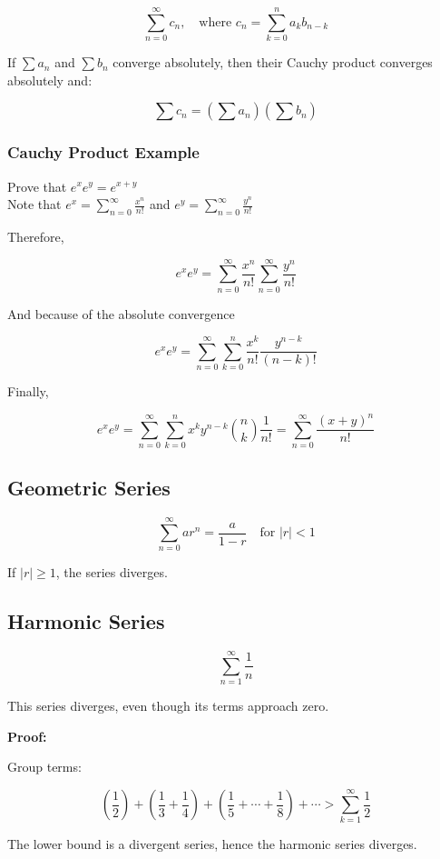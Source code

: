 \[
    \sum_{n=0}^\infty c_n, \quad \text{where } c_n = \sum_{k=0}^n a_k b_{n-k}
\]

If \(\sum a_n\) and \(\sum b_n\) converge absolutely, then their Cauchy product converges absolutely and:

\[
    \sum c_n = \left( \sum a_n \right) \left( \sum b_n \right)
\]

\subsubsection{Cauchy Product Example}

Prove that \(e^x  e^y = e^{x + y}\)\\
Note that \(e^x = \sum_{n = 0}^{\infty} \frac{x^n}{n!}\) and \(e^y = \sum_{n = 0}^{\infty} \frac{y^n}{n!}\)

Therefore,

\[
    e^x e^y = \sum_{n = 0}^{\infty} \frac{x^n}{n!} \sum_{n = 0}^{\infty} \frac{y^n}{n!}
\]

And because of the absolute convergence

\[
    e^x e^y = \sum_{n = 0}^{\infty}\sum_{k = 0}^{n} \frac{x^k}{n!} \frac{y^{n - k}}{(n-k)!}
\]

Finally,

\[
    e^x e^y = \sum_{n = 0}^{\infty}\sum_{k = 0}^{n}x^k y^{n - k} \binom{n}{k} \frac{1}{n!} = \sum_{n = 0}^{\infty} \frac{{(x + y)}^n}{n!}
\]
\QED

\subsection{Geometric Series}

\[
    \sum_{n=0}^\infty ar^n = \frac{a}{1 - r} \quad \text{for } |r| < 1
\]

If \(|r| \ge 1\), the series diverges.

\subsection{Harmonic Series}

\[
    \sum_{n=1}^{\infty} \frac{1}{n}
\]

This series diverges, even though its terms approach zero.

\textbf{Proof:} 

Group terms:

\[
    \left(\frac{1}{2}\right) + \left(\frac{1}{3} + \frac{1}{4}\right) + \left(\frac{1}{5} + \cdots + \frac{1}{8}\right) + \cdots > \sum_{k=1}^\infty \frac{1}{2}
\]

The lower bound is a divergent series, hence the harmonic series diverges.
